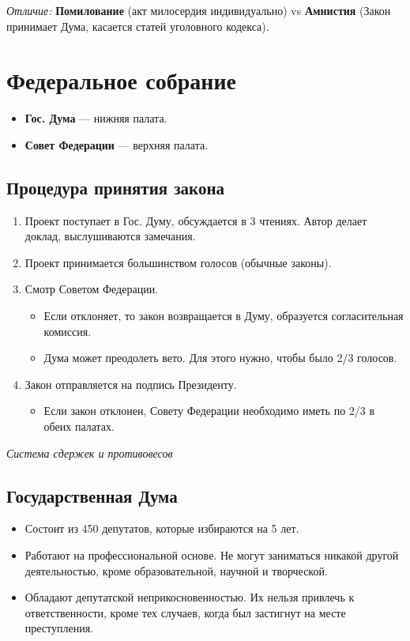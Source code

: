 \documentclass[12pt]{article}
\begin{document}
	\textit{Отличие:} \textbf{Помилование} (акт милосердия индивидуально) vs \textbf{Амнистия} (Закон принимает Дума, касается статей уголовного кодекса).
	
	\section{Федеральное собрание}
	
	\begin{itemize}
		\item \textbf{Гос. Дума} --- нижняя палата.
		\item \textbf{Совет Федерации} --- верхняя палата.
	\end{itemize}
	
	\subsection{Процедура принятия закона}
	\begin{enumerate}
		\item Проект поступает в Гос. Думу, обсуждается в 3 чтениях. Автор делает доклад, выслушиваются замечания.
		\item Проект принимается большинством голосов (обычные законы).
		\item Смотр Советом Федерации.
		\begin{itemize}
			\item Если отклоняет, то закон возвращается в Думу, образуется согласительная комиссия.
			\item Дума может преодолеть вето. Для этого нужно, чтобы было 2/3 голосов.
		\end{itemize}
		\item Закон отправляется на подпись Президенту.
		\begin{itemize}
			\item Если закон отклонен, Совету Федерации необходимо иметь по 2/3 в обеих палатах.
		\end{itemize}
	\end{enumerate}
	\textit{Система сдержек и противовесов}
	
	\subsection{Государственная Дума}
	\begin{itemize}
		\item Состоит из 450 депутатов, которые избираются на 5 лет.
		\item Работают на профессиональной основе. Не могут заниматься никакой другой деятельностью, кроме образовательной, научной и творческой.
		\item Обладают депутатской неприкосновенностью. Их нельзя привлечь к ответственности, кроме тех случаев, когда был застигнут на месте преступления.
	\end{itemize}
	
\end{document}

